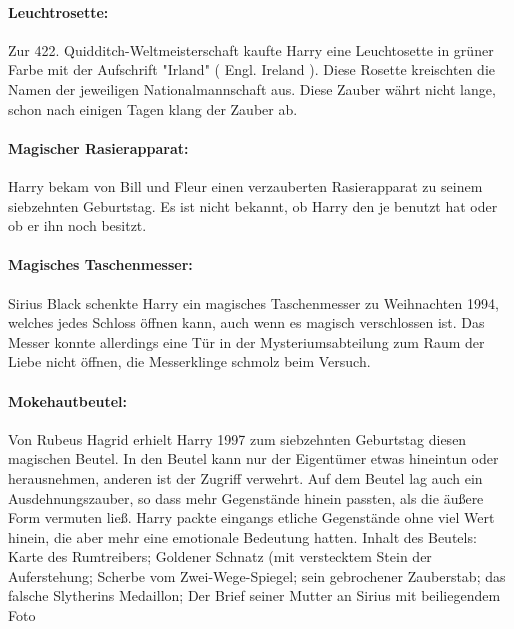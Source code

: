 \documentclass[a4paper, 10pt]{article}
\begin{document}
\paragraph{Leuchtrosette:}
Zur 422. Quidditch-Weltmeisterschaft kaufte Harry eine Leuchtosette in grüner Farbe mit der Aufschrift "Irland" (  Engl.  Ireland ). Diese Rosette kreischten die Namen der jeweiligen Nationalmannschaft aus. Diese Zauber währt nicht lange, schon nach einigen Tagen klang der Zauber ab.
\paragraph{Magischer Rasierapparat:}
Harry bekam von Bill und Fleur einen verzauberten Rasierapparat zu seinem siebzehnten Geburtstag. Es ist nicht bekannt, ob Harry den je benutzt hat oder ob er ihn noch besitzt.
\paragraph{Magisches Taschenmesser:}
Sirius Black schenkte Harry ein magisches Taschenmesser zu Weihnachten 1994, welches jedes Schloss öffnen kann, auch wenn es magisch verschlossen ist. Das Messer konnte allerdings eine Tür in der Mysteriumsabteilung zum Raum der Liebe nicht öffnen, die Messerklinge schmolz beim Versuch.
\paragraph{Mokehautbeutel:}
Von Rubeus Hagrid erhielt Harry 1997 zum siebzehnten Geburtstag diesen magischen Beutel. In den Beutel kann nur der Eigentümer etwas hineintun oder herausnehmen, anderen ist der Zugriff verwehrt. Auf dem Beutel lag auch ein Ausdehnungszauber, so dass mehr Gegenstände hinein passten, als die äußere Form vermuten ließ. Harry packte eingangs etliche Gegenstände ohne viel Wert hinein, die aber mehr eine emotionale Bedeutung hatten.
Inhalt des Beutels: Karte des Rumtreibers; Goldener Schnatz (mit verstecktem Stein der Auferstehung; Scherbe vom Zwei-Wege-Spiegel; sein gebrochener Zauberstab; das falsche Slytherins Medaillon; Der Brief seiner Mutter an Sirius mit beiliegendem Foto
\end{document}
